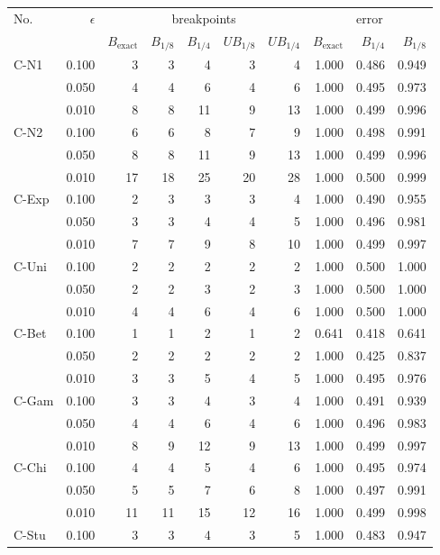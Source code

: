 \begin{tabular}{lr|rrrrr|rrr}
\toprule
No. & $\epsilon$ & \multicolumn{5}{c}{breakpoints} & \multicolumn{3}{c}{error} \\
 &  & $B_{\text{exact}}$ & $B_{1/8}$ & $B_{1/4}$ & $UB_{1/8}$ & $UB_{1/4}$ & $B_{\text{exact}}$ & $B_{1/4}$ & $B_{1/8}$ \\
\midrule
C-N1 & 0.100 & 3 & 3 & 4 & 3 & 4 & 1.000 & 0.486 & 0.949 \\
    & 0.050 & 4 & 4 & 6 & 4 & 6 & 1.000 & 0.495 & 0.973 \\
    & 0.010 & 8 & 8 & 11 & 9 & 13 & 1.000 & 0.499 & 0.996 \\
\hline
C-N2 & 0.100 & 6 & 6 & 8 & 7 & 9 & 1.000 & 0.498 & 0.991 \\
    & 0.050 & 8 & 8 & 11 & 9 & 13 & 1.000 & 0.499 & 0.996 \\
    & 0.010 & 17 & 18 & 25 & 20 & 28 & 1.000 & 0.500 & 0.999 \\
\hline
C-Exp & 0.100 & 2 & 3 & 3 & 3 & 4 & 1.000 & 0.490 & 0.955 \\
     & 0.050 & 3 & 3 & 4 & 4 & 5 & 1.000 & 0.496 & 0.981 \\
     & 0.010 & 7 & 7 & 9 & 8 & 10 & 1.000 & 0.499 & 0.997 \\
\hline
C-Uni & 0.100 & 2 & 2 & 2 & 2 & 2 & 1.000 & 0.500 & 1.000 \\
     & 0.050 & 2 & 2 & 3 & 2 & 3 & 1.000 & 0.500 & 1.000 \\
     & 0.010 & 4 & 4 & 6 & 4 & 6 & 1.000 & 0.500 & 1.000 \\
\hline
C-Bet & 0.100 & 1 & 1 & 2 & 1 & 2 & 0.641 & 0.418 & 0.641 \\
     & 0.050 & 2 & 2 & 2 & 2 & 2 & 1.000 & 0.425 & 0.837 \\
     & 0.010 & 3 & 3 & 5 & 4 & 5 & 1.000 & 0.495 & 0.976 \\
\hline
C-Gam & 0.100 & 3 & 3 & 4 & 3 & 4 & 1.000 & 0.491 & 0.939 \\
     & 0.050 & 4 & 4 & 6 & 4 & 6 & 1.000 & 0.496 & 0.983 \\
     & 0.010 & 8 & 9 & 12 & 9 & 13 & 1.000 & 0.499 & 0.997 \\
\hline
C-Chi & 0.100 & 4 & 4 & 5 & 4 & 6 & 1.000 & 0.495 & 0.974 \\
     & 0.050 & 5 & 5 & 7 & 6 & 8 & 1.000 & 0.497 & 0.991 \\
     & 0.010 & 11 & 11 & 15 & 12 & 16 & 1.000 & 0.499 & 0.998 \\
\hline
C-Stu & 0.100 & 3 & 3 & 4 & 3 & 5 & 1.000 & 0.483 & 0.947 \\

\end{tabular}
